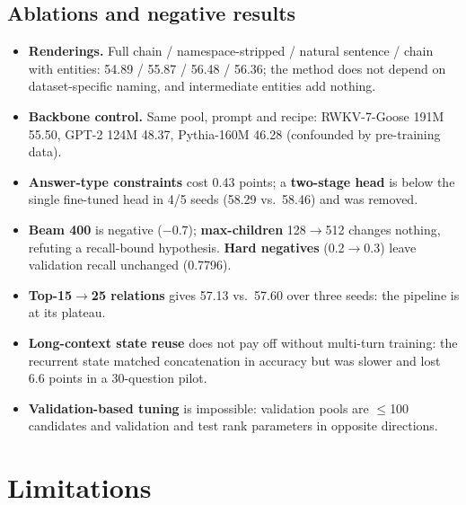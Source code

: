\documentclass[sigconf,review]{acmart}
\begin{document}
\subsection{Ablations and negative results}
\label{sec:neg}

\begin{itemize}
\item \textbf{Renderings.} Full chain / namespace-stripped / natural sentence / chain with entities: 54.89 / 55.87 / 56.48 / 56.36; the method does not depend on dataset-specific naming, and intermediate entities add nothing.
\item \textbf{Backbone control.} Same pool, prompt and recipe: RWKV-7-Goose 191M 55.50, GPT-2 124M 48.37, Pythia-160M 46.28 (confounded by pre-training data).
\item \textbf{Answer-type constraints} cost 0.43 points; a \textbf{two-stage head} is below the single fine-tuned head in 4/5 seeds (58.29 vs.\ 58.46) and was removed.
\item \textbf{Beam 400} is negative ($-0.7$); \textbf{max-children} 128$\to$512 changes nothing, refuting a recall-bound hypothesis. \textbf{Hard negatives} (0.2$\to$0.3) leave validation recall unchanged (0.7796).
\item \textbf{Top-15$\to$25 relations} gives 57.13 vs.\ 57.60 over three seeds: the pipeline is at its plateau.
\item \textbf{Long-context state reuse} does not pay off without multi-turn training: the recurrent state matched concatenation in accuracy but was slower and lost 6.6 points in a 30-question pilot.
\item \textbf{Validation-based tuning} is impossible: validation pools are $\le$100 candidates and validation and test rank parameters in opposite directions.
\end{itemize}

\section{Limitations}
\label{sec:limitations}
\end{document}
